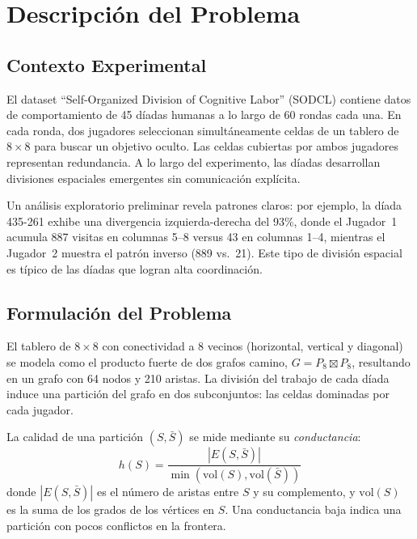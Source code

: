 \documentclass[conference]{IEEEtran}
\begin{document}
\section{Descripción del Problema}

\subsection{Contexto Experimental}

El dataset ``Self-Organized Division of Cognitive Labor'' (SODCL) \cite{andrade2021} contiene datos de comportamiento de 45 díadas humanas a lo largo de 60 rondas cada una. En cada ronda, dos jugadores seleccionan simultáneamente celdas de un tablero de $8 \times 8$ para buscar un objetivo oculto. Las celdas cubiertas por ambos jugadores representan redundancia. A lo largo del experimento, las díadas desarrollan divisiones espaciales emergentes sin comunicación explícita.

Un análisis exploratorio preliminar revela patrones claros: por ejemplo, la díada 435-261 exhibe una divergencia izquierda-derecha del 93\%, donde el Jugador~1 acumula 887 visitas en columnas 5--8 versus 43 en columnas 1--4, mientras el Jugador~2 muestra el patrón inverso (889 vs.\ 21). Este tipo de división espacial es típico de las díadas que logran alta coordinación.

\subsection{Formulación del Problema}

El tablero de $8 \times 8$ con conectividad a 8 vecinos (horizontal, vertical y diagonal) se modela como el producto fuerte de dos grafos camino, $G = P_8 \boxtimes P_8$, resultando en un grafo con 64 nodos y 210 aristas. La división del trabajo de cada díada induce una partición del grafo en dos subconjuntos: las celdas dominadas por cada jugador.

La calidad de una partición $(S, \bar{S})$ se mide mediante su \textit{conductancia}:
\begin{equation}
h(S) = \frac{|E(S, \bar{S})|}{\min(\mathrm{vol}(S), \mathrm{vol}(\bar{S}))}
\end{equation}
donde $|E(S, \bar{S})|$ es el número de aristas entre $S$ y su complemento, y $\mathrm{vol}(S)$ es la suma de los grados de los vértices en $S$. Una conductancia baja indica una partición con pocos conflictos en la frontera.
\end{document}
